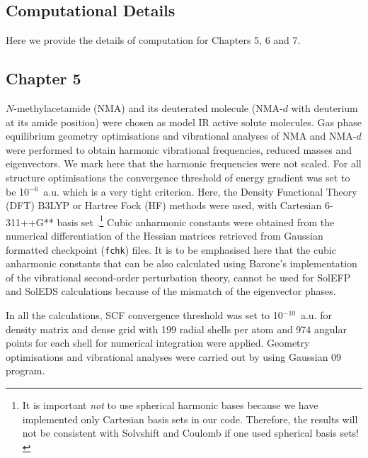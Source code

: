\documentclass[a4paper,titlepage,twoside,fleqn,12pt]{book}
\begin{document}
\begin{appendices}
\begin{refsection}
\chapter{Computational Details\label{a:computational-details}}

Here we provide the details of computation for Chapters 5, 6 and 7.

\section{Chapter 5}

$N$-methylacetamide (NMA) and its deuterated molecule
(NMA-$d$ with deuterium at its amide position) 
were chosen as model IR active solute molecules. 
Gas phase equilibrium
geometry optimisations and vibrational analyses of NMA
and NMA-$d$ were performed
to obtain harmonic vibrational frequencies, reduced
masses and eigenvectors.
We mark here that the harmonic frequencies were not scaled. 
For all structure optimisations the convergence
threshold of energy gradient was set to be 10$^{-6}$~a.u.
which is a very tight criterion.
Here, the Density Functional Theory (DFT) B3LYP \citep{Becke.JCP.1993,
Lee.Yang.Parr.PhysRevB.1988,Vosko.Wilk.Nusair.CJP.1980,
Stephens.Devlin.Chabalowski.Frisch.JPC.1994}
%
or Hartree Fock \citep{Roothaan.RevModPhys.1951} (HF) methods were used,
with Cartesian 6-311++G** 
basis set \citep{Krishnan.Binkley.Seeger.Pople.JCP.1980,
McLean.Chandler.JCP.1980}.\footnote{It is 
important \emph{not} to use spherical harmonic bases
because we have implemented only Cartesian basis sets 
in our code. Therefore, the results will not be consistent
with {\sc Solvshift} and {\sc Coulomb} if one used spherical basis sets!} 
Cubic anharmonic constants were obtained from the numerical
differentiation of the Hessian matrices retrieved from Gaussian
formatted checkpoint ({\tt fchk}) files.
It is to be emphasised here that the cubic anharmonic constants
that can be also calculated using Barone's implementation \citep{Barone.JCP.2005} 
of
the vibrational second\hyp{}order perturbation theory,
cannot be used for SolEFP and SolEDS calculations because of the mismatch of the eigenvector
phases.

In all the calculations, SCF convergence threshold
was set to 10$^{-10}$~a.u. for density matrix and dense grid with
199 radial shells per atom and 974 angular points for each
shell for numerical integration were 
applied. \citep{Lebedev.Skorokhodov.RussAcadSciDoklMAth.1992}
Geometry optimisations and vibrational analyses were carried out
by using {\sc Gaussian 09} program. \citep{Frisch.Gaussian.2009}


\end{refsection}
\end{appendices}
\end{document}
